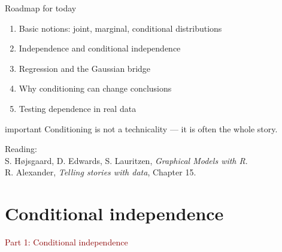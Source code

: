 \documentclass[dvipsnames,aspectratio=169,handout]{beamer}
\begin{document}
\begin{frame}{Roadmap for today}
\begin{enumerate}
    \item Basic notions: joint, marginal, conditional distributions\\[3mm]
    \item Independence and conditional independence\\[3mm]
    \item Regression and the Gaussian bridge\\[3mm]
    \item Why conditioning can change conclusions\\[3mm]
    \item Testing dependence in real data\\[3mm]
\end{enumerate}

\vspace{2mm}

\begin{beamercolorbox}[wd=\textwidth,sep=7pt,center,rounded=true,shadow=true]{important}
Conditioning is not a technicality --- it is often the whole story.
\end{beamercolorbox}
Reading:\\[.1cm]
{S. H\o jsgaard, D. Edwards, S. Lauritzen, \emph{Graphical Models with R}}.\\
{R. Alexander, \emph{Telling stories with data}, Chapter 15.}

\end{frame}


\section{Conditional independence}

\begin{frame}{}
\begin{center}
{\Huge \textcolor{DarkRed}{Part 1: Conditional independence}}
\end{center}
\end{frame}
\end{document}
